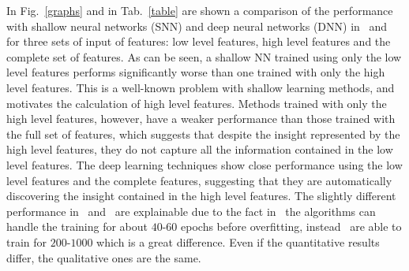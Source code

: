 In Fig.~\ref{graphs} and in Tab.~\ref{table} are shown a comparison of the
performance with shallow neural networks (SNN) and deep neural networks
(DNN) in~\cite{paper} and~\cite{gaia} for three sets of input of features:
low level features, high level features and the complete set of features.
As can be seen, a shallow NN trained using only the low level features
performs significantly worse than one trained with only the high level
features. This is a well-known problem with shallow learning methods, and
motivates the calculation of high level features. Methods trained with only
the high level features, however, have a weaker performance than those
trained with the full set of features, which suggests that despite the
insight represented by the high level features, they do not capture all
the information contained in the low level features. The deep learning
techniques show close performance using the low level features
and the complete features, suggesting that they are automatically
discovering the insight contained in the high level features. The slightly
different performance in~\cite{paper} and~\cite{gaia} are explainable due
to the fact in~\cite{gaia} the algorithms can handle the training for
about $40$-$60$ epochs before overfitting, instead~\cite{paper} are able
to train for $200$-$1000$ which is a great difference. Even if the
quantitative results differ, the qualitative ones are the same.
\begin{table}
 \centering
  \\
 \caption{}
 \label{table}
\end{table}

